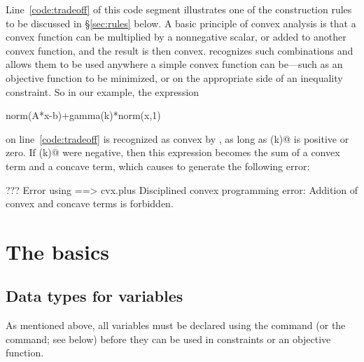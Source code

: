 \documentclass[12pt]{article}
\begin{document}
Line~\ref{code:tradeoff} of this code segment illustrates one of the
construction rules to be discussed in \S\ref{sec:rules} below. 
A basic principle of convex analysis is that a convex function
can be multiplied by a nonnegative scalar,
or added to another convex function, and the result
is then convex. 
\cvx recognizes such combinations and allows
them to be used anywhere a simple convex function can be---such as 
an objective function to be minimized, or on the appropriate side 
of an inequality constraint. So in our example, the expression
\begin{code}
	norm(A*x-b)+gamma(k)*norm(x,1)
\end{code}
on line~\ref{code:tradeoff}
is recognized as convex by \cvx, as long as \verb@gamma(k)@
is positive or zero. If \verb@gamma(k)@ were negative, then
this expression becomes the sum of a convex term and a concave
term, which causes \cvx
to generate the following error:
\begin{code}
??? Error using ==> cvx.plus
Disciplined convex programming error:
Addition of convex and concave terms is forbidden.
\end{code}

\section{The basics}

\subsection{Data types for variables}

As mentioned above, all variables must be declared using the \verb@variable@
command (or the \verb@variables@ command; see below) before they can be
used in constraints or an objective function. 
\end{document}
